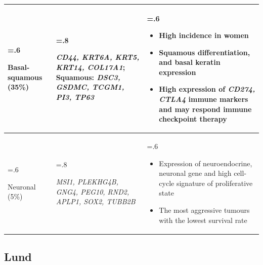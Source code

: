 \begin{table}[H]
\begin{tabularx}{\textwidth}{
      >{\hsize=.6\hsize\raggedright\arraybackslash}X
      >{\hsize=.8\hsize\raggedright\arraybackslash}X
      >{\hsize=.6\hsize\arraybackslash}X
    }
    \midrule
    Basal-squamous (35\%) &\textit{ CD44, KRT6A, KRT5, KRT14, COL17A1}; Squamous: \textit{DSC3, GSDMC, TCGM1, PI3, TP63} & 
    \begin{itemize}[leftmargin=*, nosep, after=\vspace{-\baselineskip}, before=\vspace{-.6\baselineskip}]
        \item High incidence in women
        \item Squamous differentiation, and basal keratin expression
        \item High expression of \textit{CD274, CTLA4} immune markers and may respond immune checkpoint therapy
    \end{itemize} \\
    \midrule
    Neuronal (5\%) &\textit{ MSI1, PLEKHG4B, GNG4, PEG10, RND2, APLP1, SOX2, TUBB2B} & 
    \begin{itemize}[leftmargin=*, nosep, after=\vspace{-\baselineskip}, before=\vspace{-.6\baselineskip}]
        \item Expression of neuroendocrine, neuronal gene and high cell-cycle signature of proliferative state
        \item The most aggressive tumours with the lowest survival rate
    \end{itemize} \\
    \bottomrule
    \end{tabularx}
    \label{tab:lit:tcga_genes}
\end{table}

\subsection{Lund}

